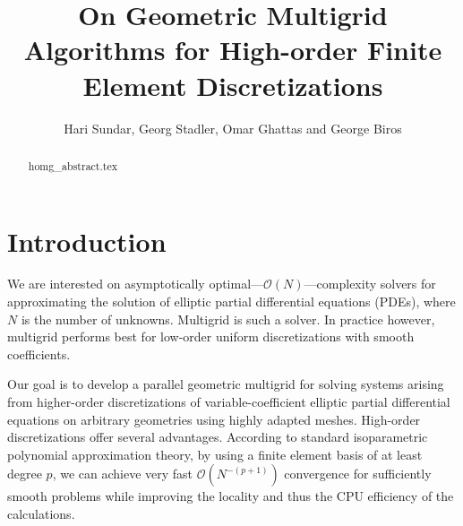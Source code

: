 \documentclass[times]{nlaauth}
\begin{document}

\title{On Geometric Multigrid Algorithms for High-order Finite Element Discretizations}

\author{Hari Sundar\corrauth, Georg Stadler, Omar Ghattas and George Biros}

\address{Institute for Computational Engineering \& Sciences, University of Texas, Austin, TX 78712}


\begin{abstract}
 {homg_abstract.tex}
\end{abstract}


\maketitle


\section{Introduction}

We are interested on asymptotically
optimal---$\mathcal{O}(N)$---complexity solvers for approximating the
solution of elliptic partial differential equations (PDEs), where $N$
is the number of unknowns.  Multigrid is such a solver. In practice
however, multigrid performs best for low-order uniform discretizations
with smooth coefficients. 

Our goal is to develop a parallel geometric multigrid for solving
systems arising from higher-order discretizations of
variable-coefficient elliptic partial differential equations on
arbitrary geometries using highly adapted meshes.
High-order discretizations offer several advantages.  According to
standard isoparametric polynomial approximation theory,
by using a finite element basis of at least degree $p$, we can achieve
very fast $\mathcal{O}(N^{-(p+1)})$ convergence for sufficiently
smooth problems while improving the locality and thus the CPU
efficiency of the calculations.
\end{document}
